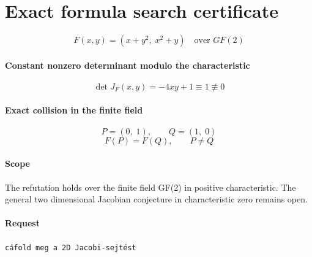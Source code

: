 \documentclass{article}
\begin{document}
\section*{Exact formula search certificate}

\begin{equation}
  F(x,y) = \left(x + y^{2},\;x^{2} + y\right)\quad\text{over } GF(2)
\end{equation}

\paragraph{Constant nonzero determinant modulo the characteristic}
\[
  \det J_F(x,y) = - 4 x y + 1 \equiv 1 \not\equiv 0
\]

\paragraph{Exact collision in the finite field}
\[
  P = \left(0,\;1\right),\qquad Q = \left(1,\;0\right)
\]
\[
  F(P) = F(Q),\qquad P \neq Q
\]

\paragraph{Scope}
The refutation holds over the finite field GF(2) in positive characteristic. The general two dimensional Jacobian conjecture in characteristic zero remains open.

\paragraph{Request}
\texttt{cáfold meg a 2D Jacobi-sejtést}
\end{document}
